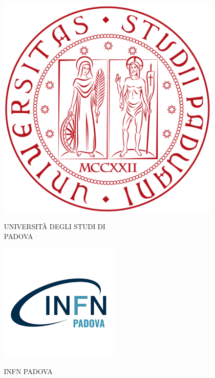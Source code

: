 \documentclass[11pt]{article}
\renewcommand{\>}{\rangle} \renewcommand{\emptyset}{\varnothing}
\begin{document}
\begin{figure}[]
  \centering \vspace{1cm}
  \begin{minipage}[t]{.45\textwidth}
    \centering \includegraphics[width=.3\linewidth]{images/Padova}
    \begin{center}
      {\large{U}\normalsize{NIVERSITÀ DEGLI}\large{ S}\normalsize{TUDI DI}}\\
      {\large{ P}\normalsize{ADOVA}}
    \end{center}
  \end{minipage}%
  \hspace{0.5cm}
  \begin{minipage}[t]{.45\textwidth}
    \centering \includegraphics[width=.4\linewidth]{images/infn}
    \begin{center}
      {\large{I}\normalsize{NFN }\large{ P}\normalsize{ADOVA}}
    \end{center}
  \end{minipage}
\end{figure}
\end{document}

